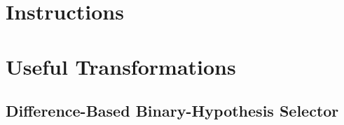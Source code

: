 \documentclass[onecolumn]{ctexart}
\begin{document}


\vspace{30pt}
\section{Instructions}



\vspace{30pt}
\section{Useful Transformations}



\vspace{30pt}
\subsection{Difference-Based Binary-Hypothesis Selector}
\end{document}
